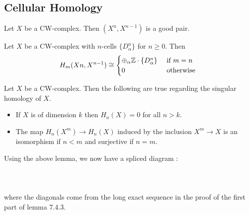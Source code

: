 \documentclass[a4paper]{article}
\begin{document}
\subsection{Cellular Homology}
\begin{lmm}{}{} Let $X$ be a CW-complex. Then $(X^n,X^{n-1})$ is a good pair. 
\end{lmm}

\begin{lmm}{}{} Let $X$ be a CW-complex with $n$-cells $\{D_\alpha^n\}$ for $n\geq 0$. Then $$H_m(Xn,X^{n-1})\cong\begin{cases}
\oplus_\alpha\mathbb{Z}\cdot\{D_\alpha^n\} & \text{ if } m=n\\
0 & \text{ otherwise }
\end{cases}$$
\end{lmm}

\begin{lmm}{}{} Let $X$ be a CW-complex. Then the following are true regarding the singular homology of $X$. 
\begin{itemize}
\item If $X$ is of dimension $k$ then $H_n(X)=0$ for all $n>k$. 
\item The map $H_n(X^m)\to H_n(X)$ induced by the inclusion $X^m\to X$ is an isomorphism if $n<m$ and surjective if $n=m$. 
\end{itemize}
\end{lmm}

Using the above lemma, we now have a spliced diagram : 
\\~\\
\\~\\
where the diagonals come from the long exact sequence in the proof of the first part of lemma 7.4.3. 
\end{document}
